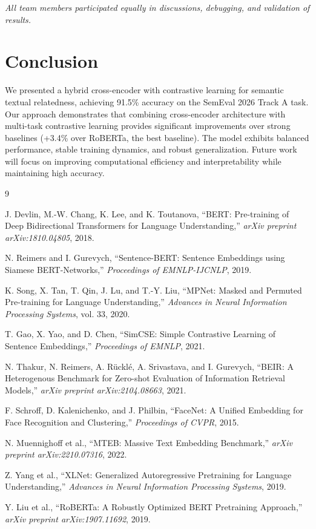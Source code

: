 \documentclass[conference]{IEEEtran}
\begin{document}
\textit{All team members participated equally in discussions, debugging, and validation of results.}

\section{Conclusion}

We presented a hybrid cross-encoder with contrastive learning for semantic textual relatedness, achieving 91.5\% accuracy on the SemEval 2026 Track A task. Our approach demonstrates that combining cross-encoder architecture with multi-task contrastive learning provides significant improvements over strong baselines (+3.4\% over RoBERTa, the best baseline). The model exhibits balanced performance, stable training dynamics, and robust generalization. Future work will focus on improving computational efficiency and interpretability while maintaining high accuracy.

\begin{thebibliography}{9}

J. Devlin, M.-W. Chang, K. Lee, and K. Toutanova,
``BERT: Pre-training of Deep Bidirectional Transformers for Language Understanding,''
\textit{arXiv preprint arXiv:1810.04805}, 2018.

N. Reimers and I. Gurevych,
``Sentence-BERT: Sentence Embeddings using Siamese BERT-Networks,''
\textit{Proceedings of EMNLP-IJCNLP}, 2019.

K. Song, X. Tan, T. Qin, J. Lu, and T.-Y. Liu,
``MPNet: Masked and Permuted Pre-training for Language Understanding,''
\textit{Advances in Neural Information Processing Systems}, vol. 33, 2020.

T. Gao, X. Yao, and D. Chen,
``SimCSE: Simple Contrastive Learning of Sentence Embeddings,''
\textit{Proceedings of EMNLP}, 2021.

N. Thakur, N. Reimers, A. Rücklé, A. Srivastava, and I. Gurevych,
``BEIR: A Heterogenous Benchmark for Zero-shot Evaluation of Information Retrieval Models,''
\textit{arXiv preprint arXiv:2104.08663}, 2021.

F. Schroff, D. Kalenichenko, and J. Philbin,
``FaceNet: A Unified Embedding for Face Recognition and Clustering,''
\textit{Proceedings of CVPR}, 2015.

N. Muennighoff et al.,
``MTEB: Massive Text Embedding Benchmark,''
\textit{arXiv preprint arXiv:2210.07316}, 2022.

Z. Yang et al.,
``XLNet: Generalized Autoregressive Pretraining for Language Understanding,''
\textit{Advances in Neural Information Processing Systems}, 2019.

Y. Liu et al.,
``RoBERTa: A Robustly Optimized BERT Pretraining Approach,''
\textit{arXiv preprint arXiv:1907.11692}, 2019.

\end{thebibliography}
\end{document}
